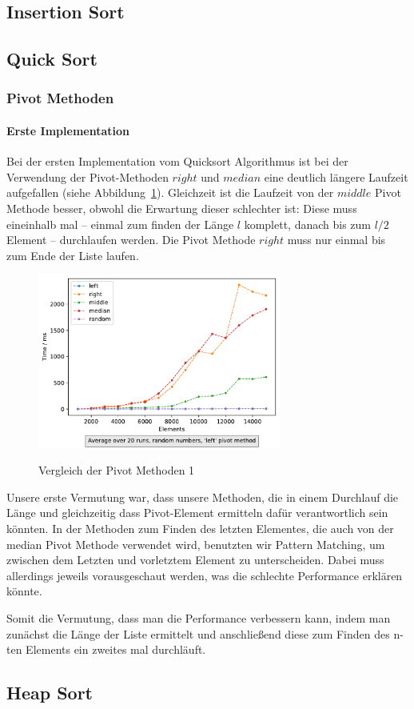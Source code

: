 \subsection{Insertion Sort}\label{subsec:insertion-sort-laufzeit}

\subsection{Quick Sort}\label{subsec:quick-sort-laufzeit}

\subsubsection{Pivot Methoden}

\paragraph{Erste Implementation}
Bei der ersten Implementation vom Quicksort Algorithmus ist bei der
Verwendung der Pivot-Methoden \(right\) und \(median\)  eine deutlich längere
Laufzeit aufgefallen (siehe Abbildung~\ref{fig:qsort-first-impl}).
Gleichzeit ist die Laufzeit von der \(middle\) Pivot Methode besser, obwohl
die Erwartung dieser schlechter ist:
Diese muss eineinhalb mal -- einmal zum finden der Länge \(l\) komplett, danach
bis zum \(l/2\) Element -- durchlaufen werden.
Die Pivot Methode \(right\) muss nur einmal bis zum Ende der Liste laufen.

\begin{figure}[hbt]
    \caption{Vergleich der Pivot Methoden 1}
    \centering
    \includegraphics[width = 8cm]
    {../out/pivotMethods_firstImplementation}\label{fig:qsort-first-impl}
\end{figure}

Unsere erste Vermutung war, dass unsere Methoden, die in einem
Durchlauf die Länge und gleichzeitig dass Pivot-Element ermitteln dafür
verantwortlich sein könnten.
In der Methoden zum Finden des letzten Elementes, die auch von der median
Pivot Methode verwendet wird, benutzten wir Pattern Matching, um zwischen dem
Letzten und vorletztem Element zu unterscheiden.
Dabei muss allerdings jeweils vorausgeschaut werden, was die schlechte
Performance erklären könnte.

Somit die Vermutung, dass man die Performance verbessern kann, indem man
zunächst die Länge der Liste ermittelt und anschließend diese zum Finden des
n-ten Elements ein zweites mal durchläuft.


\FloatBarrier

\subsection{Heap Sort}\label{subsec:heap-sort-laufzeit}
